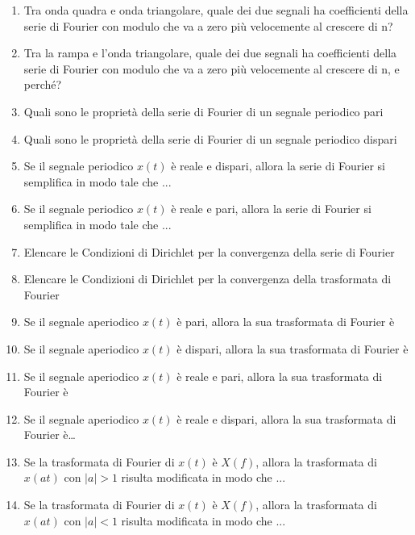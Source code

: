 \documentclass[
]{article}
\begin{document}
\begin{enumerate}
\item 
Tra onda quadra e onda triangolare, quale dei due segnali ha coefficienti della serie di Fourier con modulo che
va a zero più velocemente al crescere di n?

\item
Tra la rampa e l'onda triangolare, quale dei due segnali ha
coefficienti della serie di Fourier con modulo che va a zero più
velocemente al crescere di n, e perché?

\item
Quali sono le proprietà della serie di Fourier di un segnale periodico
pari

\item
Quali sono le proprietà della serie di Fourier di un segnale periodico
dispari

\item 
Se il segnale periodico $x(t)$ è reale e dispari, allora la serie di Fourier si semplifica in modo tale che ...


\item 
Se il segnale periodico $x(t)$ è reale e pari, allora la serie di Fourier si semplifica in modo tale che ...


\item
Elencare le Condizioni di Dirichlet per la convergenza della serie di
Fourier

\item 
Elencare le Condizioni di Dirichlet per la convergenza della trasformata di Fourier



\item 
Se il segnale aperiodico $x(t)$ è pari, allora la sua trasformata di Fourier è	

\item 
Se il segnale aperiodico $x(t)$ è dispari, allora la sua trasformata di Fourier è

\item 
Se il segnale aperiodico $x(t)$ è reale e pari, allora la sua trasformata di Fourier è

\item
Se il segnale aperiodico $x(t)$ è reale e dispari, allora la sua
trasformata di Fourier è\ldots{}

\item 
Se la trasformata di Fourier di $x(t)$ è $X(f)$, allora la trasformata di $x(at)$ con $|a|>1$ risulta modificata in modo
che ...

\item 
Se la trasformata di Fourier di $x(t)$ è $X(f)$, allora la trasformata di $x(at)$ con $|a|<1$ risulta modificata in modo che ...




\end{enumerate}
\end{document}
